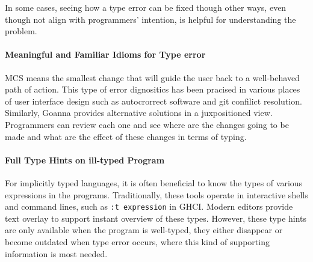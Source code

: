 \documentclass[pdflatex,sn-mathphys-num]{sn-jnl}%
\begin{document}
    In some cases, seeing how a type error can be fixed though other ways, even though not align with programmers' intention, is helpful for understanding the problem. 


    \paragraph{Meaningful and Familiar Idioms for Type error}
    MCS means the smallest change that will guide the user back to a well-behaved path of action. This type of error dignositics has been pracised in various places of user interface design such as autocrorrect software and git confilict resolution. Similarly, Goanna provides alternative solutions in a juxpositioned view. Programmers can review each one and see where are the changes going to be made and what are the effect of these changes in terms of typing.


    
    \paragraph{Full Type Hints on ill-typed Program}
    For implicitly typed languages, it is often beneficial to know the types of various expressions in the programs. Traditionally, these tools operate in interactive shells and command lines, such as \texttt{:t expression} in GHCI. Modern editors provide text overlay to support instant overview of these types. However, these type hints are only available when the program is well-typed, they either disappear or become outdated when type error occurs, where this kind of supporting information is most needed.
\end{document}
